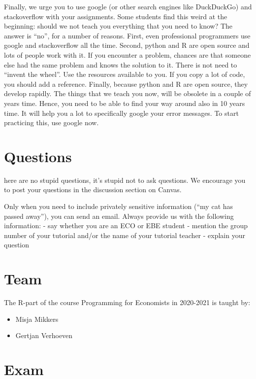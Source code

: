 \documentclass[
]{book}
\providecommand{\tightlist}{%
  \setlength{\itemsep}{0pt}\setlength{\parskip}{0pt}}
\begin{document}
Finally, we urge you to use google (or other search engines like DuckDuckGo) and stackoverflow with your assignments. Some students find this weird at the beginning: should we not teach you everything that you need to know? The answer is ``no'', for a number of reasons. First, even professional programmers use google and stackoverflow all the time. Second, python and R are open source and lots of people work with it. If you encounter a problem, chances are that someone else had the same problem and knows the solution to it. There is not need to ``invent the wheel''. Use the resources available to you. If you copy a lot of code, you should add a reference. Finally, because python and R are open source, they develop rapidly. The things that we teach you now, will be obsolete in a couple of years time. Hence, you need to be able to find your way around also in 10 years time. It will help you a lot to specifically google your error messages.
To start practicing this, use google now.

\hypertarget{questions}{%
\section{Questions}\label{questions}}

here are no stupid questions, it's stupid not to ask questions. We encourage you to post your questions in the discussion section on Canvas.

Only when you need to include privately sensitive information (``my cat has passed away''), you can send an email. Always provide us with the following information: - say whether you are an ECO or EBE student - mention the group number of your tutorial and/or the name of your tutorial teacher - explain your question

\hypertarget{team}{%
\section{Team}\label{team}}

The R-part of the course Programming for Economists in 2020-2021 is taught by:

\begin{itemize}
\tightlist
\item
  Misja Mikkers
\item
  Gertjan Verhoeven
\end{itemize}

\hypertarget{exam}{%
\section{Exam}\label{exam}}
\end{document}
